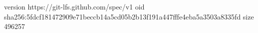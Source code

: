 version https://git-lfs.github.com/spec/v1
oid sha256:5fdcf181472909e71beccb14a5cd05b2b13f191a447fffe4eba5a3503a8335fd
size 496257
